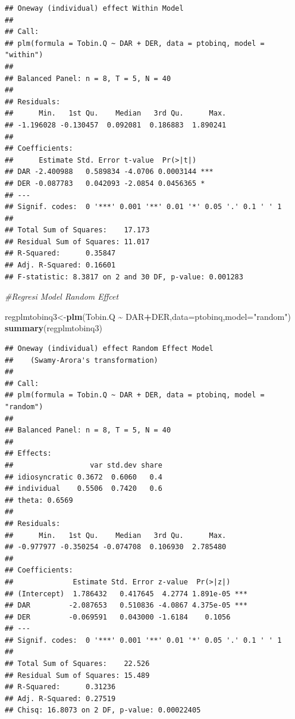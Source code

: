 \documentclass[
]{book}
\newenvironment{Shaded}{\begin{snugshade}}{\end{snugshade}}
\newcommand{\AttributeTok}[1]{\textcolor[rgb]{0.13,0.29,0.53}{#1}}
\newcommand{\CommentTok}[1]{\textcolor[rgb]{0.56,0.35,0.01}{\textit{#1}}}
\newcommand{\FunctionTok}[1]{\textcolor[rgb]{0.13,0.29,0.53}{\textbf{#1}}}
\newcommand{\NormalTok}[1]{#1}
\newcommand{\OtherTok}[1]{\textcolor[rgb]{0.56,0.35,0.01}{#1}}
\newcommand{\SpecialCharTok}[1]{\textcolor[rgb]{0.81,0.36,0.00}{\textbf{#1}}}
\newcommand{\StringTok}[1]{\textcolor[rgb]{0.31,0.60,0.02}{#1}}
\theoremstyle{definition}
\theoremstyle{definition}
\theoremstyle{definition}
\theoremstyle{definition}
\theoremstyle{remark}
\begin{document}
\begin{verbatim}
## Oneway (individual) effect Within Model
## 
## Call:
## plm(formula = Tobin.Q ~ DAR + DER, data = ptobinq, model = "within")
## 
## Balanced Panel: n = 8, T = 5, N = 40
## 
## Residuals:
##      Min.   1st Qu.    Median   3rd Qu.      Max. 
## -1.196028 -0.130457  0.092081  0.186883  1.890241 
## 
## Coefficients:
##      Estimate Std. Error t-value  Pr(>|t|)    
## DAR -2.400988   0.589834 -4.0706 0.0003144 ***
## DER -0.087783   0.042093 -2.0854 0.0456365 *  
## ---
## Signif. codes:  0 '***' 0.001 '**' 0.01 '*' 0.05 '.' 0.1 ' ' 1
## 
## Total Sum of Squares:    17.173
## Residual Sum of Squares: 11.017
## R-Squared:      0.35847
## Adj. R-Squared: 0.16601
## F-statistic: 8.3817 on 2 and 30 DF, p-value: 0.001283
\end{verbatim}

\begin{Shaded}
\begin{Highlighting}[]
\CommentTok{\#Regresi Model Random Effcet}

\NormalTok{regplmtobinq3}\OtherTok{\textless{}{-}}\FunctionTok{plm}\NormalTok{(Tobin.Q }\SpecialCharTok{\textasciitilde{}}\NormalTok{ DAR}\SpecialCharTok{+}\NormalTok{DER,}\AttributeTok{data=}\NormalTok{ptobinq,}\AttributeTok{model=}\StringTok{"random"}\NormalTok{)}
\FunctionTok{summary}\NormalTok{(regplmtobinq3)}
\end{Highlighting}
\end{Shaded}

\begin{verbatim}
## Oneway (individual) effect Random Effect Model 
##    (Swamy-Arora's transformation)
## 
## Call:
## plm(formula = Tobin.Q ~ DAR + DER, data = ptobinq, model = "random")
## 
## Balanced Panel: n = 8, T = 5, N = 40
## 
## Effects:
##                  var std.dev share
## idiosyncratic 0.3672  0.6060   0.4
## individual    0.5506  0.7420   0.6
## theta: 0.6569
## 
## Residuals:
##      Min.   1st Qu.    Median   3rd Qu.      Max. 
## -0.977977 -0.350254 -0.074708  0.106930  2.785480 
## 
## Coefficients:
##              Estimate Std. Error z-value  Pr(>|z|)    
## (Intercept)  1.786432   0.417645  4.2774 1.891e-05 ***
## DAR         -2.087653   0.510836 -4.0867 4.375e-05 ***
## DER         -0.069591   0.043000 -1.6184    0.1056    
## ---
## Signif. codes:  0 '***' 0.001 '**' 0.01 '*' 0.05 '.' 0.1 ' ' 1
## 
## Total Sum of Squares:    22.526
## Residual Sum of Squares: 15.489
## R-Squared:      0.31236
## Adj. R-Squared: 0.27519
## Chisq: 16.8073 on 2 DF, p-value: 0.00022405
\end{verbatim}
\end{document}
